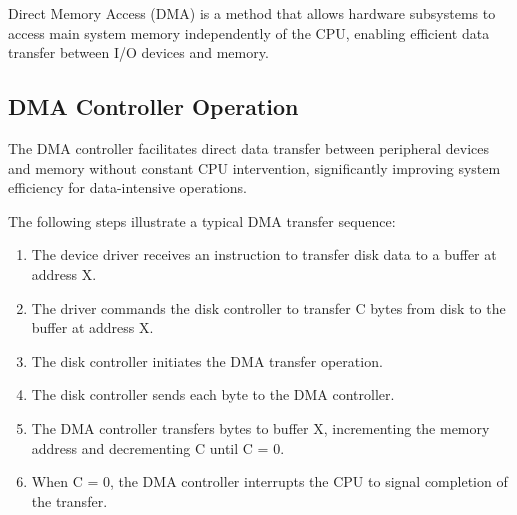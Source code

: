 \documentclass[../../compsys.tex]{subfiles}
\begin{document}
\begin{definition}
Direct Memory Access (DMA) is a method that allows hardware subsystems to access main system memory independently of the CPU, enabling efficient data transfer between I/O devices and memory.
\end{definition}

\subsection{DMA Controller Operation}

The DMA controller facilitates direct data transfer between peripheral devices and memory without constant CPU intervention, significantly improving system efficiency for data-intensive operations.

\begin{minipage}{0.45\textwidth}
The following steps illustrate a typical DMA transfer sequence:
\begin{enumerate}
    \item The device driver receives an instruction to transfer disk data to a buffer at address X.
    \item The driver commands the disk controller to transfer C bytes from disk to the buffer at address X.
    \item The disk controller initiates the DMA transfer operation.
    \item The disk controller sends each byte to the DMA controller.
    \item The DMA controller transfers bytes to buffer X, incrementing the memory address and decrementing C until C = 0.
    \item When C = 0, the DMA controller interrupts the CPU to signal completion of the transfer.
\end{enumerate}
\end{minipage}
\hfill
\vline
\hfill
\end{document}
